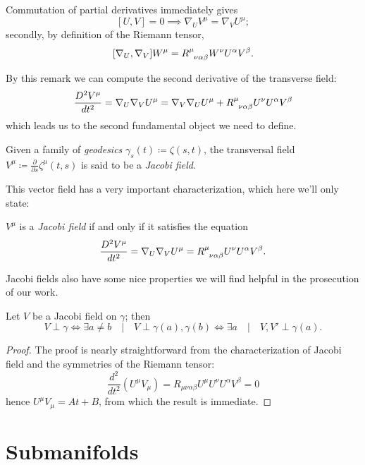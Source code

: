 \begin{remark}
	Commutation of partial derivatives immediately gives 
	\[
	[U, V] = 0 \implies \nabla_U V^{\mu} = \nabla_V U^{\mu};
	\]
	secondly, by definition of the Riemann tensor,
	\[
	[\nabla_U, \nabla_V]W^{\mu} = R\indices{^{\mu}_{\nu\alpha\beta}}W^{\nu}U^{\alpha}V^{\beta}.
	\]
\end{remark}
By this remark we can compute the second derivative of the transverse field:
\[
\frac{D^2\tensor{V}{^\mu} }{dt^2} = \nabla_U\nabla_V U^{\mu} = \nabla_V\nabla_U U^{\mu} + R\indices{^{\mu}_{\nu\alpha\beta}}U^{\nu}U^{\alpha}V^{\beta}
\]
which leads us to the second fundamental object we need to define. 
\begin{definition}
	Given a family of \emph{geodesics} \(\gamma_s(t) \coloneqq \zeta(s,t)\), the transversal field \(V^{\mu} \coloneqq \frac{\partial}{\partial s} \zeta^{\mu}(t,s)\) is said to be a \emph{Jacobi field}.
\end{definition}
This vector field has a very important characterization, which here we'll only state:
\begin{lemma}
\(V^{\mu}\) is a \emph{Jacobi field} if and only if it satisfies the equation
	\begin{equation}
	\label{eq:Jacobi}
		\frac{D^2\tensor{V}{^\mu} }{dt^2} = \nabla_U\nabla_V U^{\mu} =  R\indices{^{\mu}_{\nu\alpha\beta}}U^{\nu}U^{\alpha}V^{\beta}.
	\end{equation}
\end{lemma}
Jacobi fields also have some nice properties we will find helpful in the prosecution of our work.
\begin{lemma}
	\label{lemma:Jacobi-fields-properties}
	Let \(V\) be a Jacobi field on \(\gamma\); then
	\[
	V \perp \gamma \iff \exists a\neq b \quad\vert\quad V\perp \gamma(a),\gamma(b) \iff \exists a \quad\vert\quad V, V' \perp \gamma(a).
	\]
\end{lemma}
\begin{proof}
	The proof is nearly straightforward from the characterization of Jacobi field and the symmetries of the Riemann tensor:
	\[
	\frac{d^2}{dt^2} (U^{\mu}V_{\mu}) = R_{\mu\nu\alpha\beta}U^{\mu}U^{\nu}U^{\alpha}V^{\beta} = 0
	\]
	hence \(U^{\mu}V_{\mu} = At + B\), from which the result is immediate.
\end{proof}


\section{Submanifolds}
\label{sec:submanifolds}

